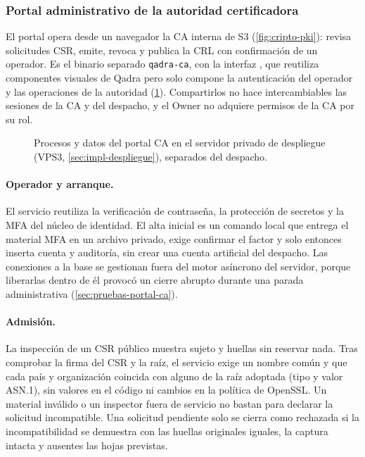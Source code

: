 \subsubsection{Portal administrativo de la autoridad certificadora}
\label{sec:impl-portal-ca}

El portal opera desde un navegador la CA interna de S3 (\cref{fig:cripto-pki}):
revisa solicitudes CSR, emite, revoca y publica la CRL con confirmación de un
operador. Es el binario separado \texttt{qadra-ca}, con la interfaz
, que reutiliza componentes visuales de Qadra pero solo
compone la autenticación del operador y las operaciones de la autoridad
(\cref{fig:impl-ca-zonas}). Compartirlos no hace intercambiables las sesiones
de la CA y del despacho, y el Owner no adquiere permisos de la CA por su rol.

\begin{figure}[!htbp]
  \centering
  
  \caption{Procesos y datos del portal CA en el servidor privado de despliegue (VPS3, \cref{sec:impl-despliegue}), separados del despacho.}
  \label{fig:impl-ca-zonas}
\end{figure}

\paragraph{Operador y arranque.} El servicio reutiliza la verificación de
contraseña, la protección de secretos y la MFA del núcleo de identidad. El alta
inicial es un comando local que entrega el material MFA en un archivo privado,
exige confirmar el factor y solo entonces inserta cuenta y auditoría, sin crear
una cuenta artificial del despacho. Las conexiones a la base se gestionan fuera
del motor asíncrono del servidor, porque liberarlas dentro de él provocó un
cierre abrupto durante una parada administrativa (\cref{sec:pruebas-portal-ca}).

\paragraph{Admisión.} La inspección de un CSR público muestra sujeto y
huellas sin reservar nada. Tras comprobar la firma del CSR y la raíz, el
servicio exige un nombre común y que cada país y organización coincida con
alguno de la raíz adoptada (tipo y valor ASN.1), sin valores en el código ni
cambios en la política de OpenSSL. Un material inválido o un inspector fuera de
servicio no bastan para declarar la solicitud incompatible. Una solicitud
pendiente solo se cierra como rechazada si la incompatibilidad se demuestra con
las huellas originales iguales, la captura intacta y ausentes las hojas previstas.

